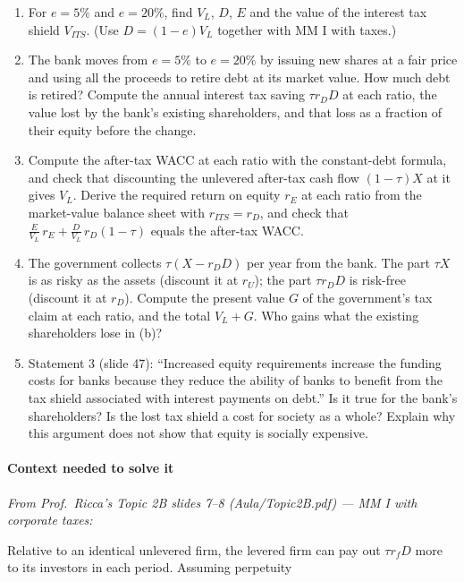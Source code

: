 \documentclass[11pt,a4paper]{article}
\numberwithin{equation}{section}
\begin{document}
\begin{enumerate}
\def\labelenumi{\alph{enumi}.}
\item
  For \(e = 5\%\) and \(e = 20\%\), find \(V_L\), \(D\), \(E\) and the value of the interest tax
  shield \(V_{ITS}\). (Use \(D = (1 - e)V_L\) together with MM I with taxes.)
\item
  The bank moves from \(e = 5\%\) to \(e = 20\%\) by issuing new shares at a fair price and using
  all the proceeds to retire debt at its market value. How much debt is retired? Compute the annual
  interest tax saving \(\tau r_D D\) at each ratio, the value lost by the bank's existing
  shareholders, and that loss as a fraction of their equity before the change.
\item
  Compute the after-tax WACC at each ratio with the constant-debt formula, and check that
  discounting the unlevered after-tax cash flow \((1 - \tau)X\) at it gives \(V_L\). Derive the
  required return on equity \(r_E\) at each ratio from the market-value balance sheet with
  \(r_{ITS} = r_D\), and check that \(\frac{E}{V_L}\,r_E + \frac{D}{V_L}\,r_D(1 - \tau)\) equals the
  after-tax WACC.
\item
  The government collects \(\tau(X - r_D D)\) per year from the bank. The part \(\tau X\) is as
  risky as the assets (discount it at \(r_U\)); the part \(\tau r_D D\) is risk-free (discount it at
  \(r_D\)). Compute the present value \(G\) of the government's tax claim at each ratio, and the
  total \(V_L + G\). Who gains what the existing shareholders lose in (b)?
\item
  Statement 3 (slide 47): ``Increased equity requirements increase the funding costs for banks
  because they reduce the ability of banks to benefit from the tax shield associated with interest
  payments on debt.'' Is it true for the bank's shareholders? Is the lost tax shield a cost for
  society as a whole? Explain why this argument does not show that equity is socially expensive.
\end{enumerate}

\paragraph{Context needed to solve it}

\emph{From Prof.~Ricca's Topic 2B slides 7--8 (Aula/Topic2B.pdf) --- MM I with corporate taxes:}

Relative to an identical unlevered firm, the levered firm can pay out \(\tau r_f D\) more to its
investors in each period. Assuming perpetuity
\end{document}
